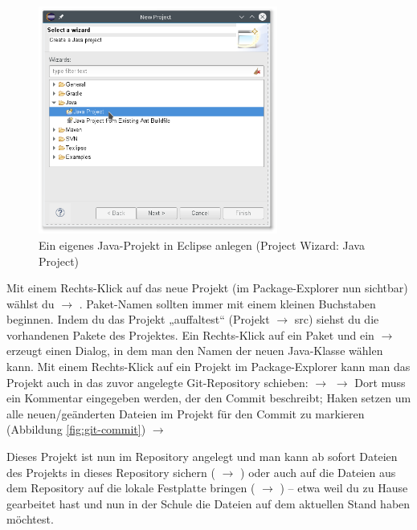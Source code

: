 \begin{figure}[h]
  \centering
   \includegraphics[width=0.70\textwidth]{./inf/SEKII/01_Vorbereitung/Import_Project_from_Git_using_Project_Wizard_2.png}
   \caption{Ein eigenes Java-Projekt in Eclipse anlegen (Project Wizard: Java Project)}
   \label{fig:import-project-from-git-using-wizard-2}
\end{figure}


\clearpage

Mit einem Rechts-Klick auf das neue Projekt (im Package-Explorer nun sichtbar)
wählst du  $\rightarrow$ . Paket-Namen sollten immer
mit einem kleinen Buchstaben beginnen. Indem du das Projekt „auffaltest“
(Projekt $\rightarrow$ src) siehst du die vorhandenen Pakete des Projektes. Ein
Rechts-Klick auf ein Paket und ein  $\rightarrow$ 
erzeugt einen Dialog, in dem man den Namen der neuen Java-Klasse wählen kann.
Mit einem Rechts-Klick auf ein Projekt im Package-Explorer kann man das Projekt
auch in das zuvor angelegte Git-Repository schieben: 
$\rightarrow$  $\rightarrow$ Dort muss ein Kommentar
eingegeben werden, der den Commit beschreibt; Haken setzen um alle
neuen/geänderten Dateien im Projekt für den Commit zu markieren (Abbildung
\ref{fig:git-commit}) $\rightarrow$ 

Dieses Projekt ist nun im Repository angelegt und man kann ab sofort Dateien des
Projekts in dieses Repository sichern ( $\rightarrow$
) oder auch auf die Dateien aus dem Repository auf die
lokale Festplatte bringen ( $\rightarrow$ )
-- etwa weil du zu Hause gearbeitet hast und nun in der Schule die Dateien auf
dem aktuellen Stand haben möchtest.

